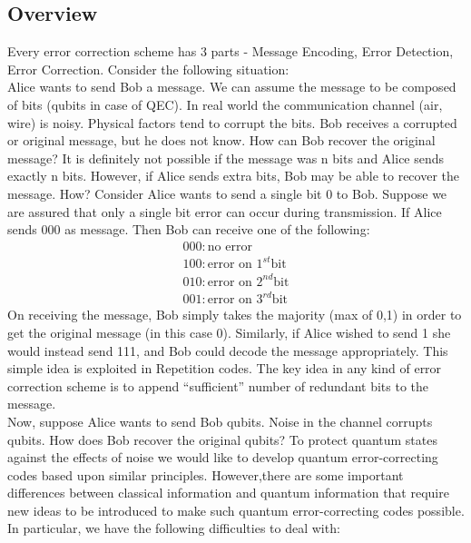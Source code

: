 \documentclass[12pt]{report}
\begin{document}
\subsection{Overview}
Every error correction scheme has 3 parts - Message Encoding, Error Detection, Error Correction. Consider the following situation:\\
Alice wants to send Bob a message. We can assume the message to be composed of bits (qubits in case of QEC). In real world the communication channel (air, wire) is noisy. Physical factors tend to corrupt the bits. Bob receives a corrupted or original message, but he does not know. How can Bob recover the original message? It is definitely not possible if the message was n bits and Alice sends exactly n bits. However, if Alice sends extra bits, Bob may be able to recover the message. How? Consider Alice wants to send a single bit 0 to Bob. Suppose we are assured that only a single bit error can occur during transmission. If Alice sends 000 as message. Then Bob can receive one of the following:
\begin{equation*}
\begin{split}
000: \text{no error}\\	
100: \text{error on } 1^{st} \text{bit}\\
010: \text{error on } 2^{nd} \text{bit}\\
001: \text{error on } 3^{rd} \text{bit}
\end{split}
\end{equation*}
On receiving the message, Bob simply takes the majority (max of 0,1) in order to get the original message (in this case 0). Similarly, if Alice wished to send 1 she would instead send 111, and Bob could decode the message appropriately. This simple idea is exploited in Repetition codes. The key idea in any kind of error correction scheme is to append “sufficient” number of redundant bits to the message.\\
Now, suppose Alice wants to send Bob qubits. Noise in the channel corrupts qubits. How does Bob recover the original qubits?  To protect quantum states against the effects of noise we would like to develop quantum error-correcting codes based upon similar principles. However,there are some important differences between classical information and quantum information that require new ideas to be introduced to make such quantum error-correcting codes possible. In particular, we have the following difficulties to deal with:
\end{document}
